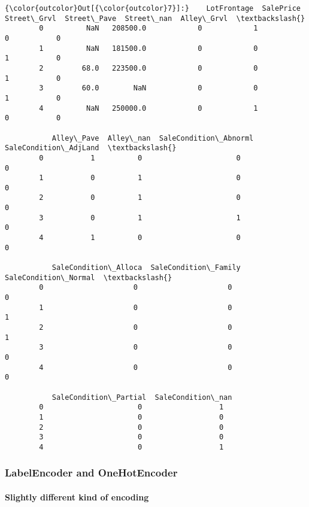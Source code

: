 \documentclass[11pt]{article}
\begin{document}
\begin{Verbatim}[commandchars=\\\{\}]
{\color{outcolor}Out[{\color{outcolor}7}]:}    LotFrontage  SalePrice  Street\_Grvl  Street\_Pave  Street\_nan  Alley\_Grvl  \textbackslash{}
        0          NaN   208500.0            0            1           0           0   
        1          NaN   181500.0            0            0           1           0   
        2         68.0   223500.0            0            0           1           0   
        3         60.0        NaN            0            0           1           0   
        4          NaN   250000.0            0            1           0           0   
        
           Alley\_Pave  Alley\_nan  SaleCondition\_Abnorml  SaleCondition\_AdjLand  \textbackslash{}
        0           1          0                      0                      0   
        1           0          1                      0                      0   
        2           0          1                      0                      0   
        3           0          1                      1                      0   
        4           1          0                      0                      0   
        
           SaleCondition\_Alloca  SaleCondition\_Family  SaleCondition\_Normal  \textbackslash{}
        0                     0                     0                     0   
        1                     0                     0                     1   
        2                     0                     0                     1   
        3                     0                     0                     0   
        4                     0                     0                     0   
        
           SaleCondition\_Partial  SaleCondition\_nan  
        0                      0                  1  
        1                      0                  0  
        2                      0                  0  
        3                      0                  0  
        4                      0                  1  
\end{Verbatim}
            
    \subsubsection{LabelEncoder and
OneHotEncoder}\label{labelencoder-and-onehotencoder}

\paragraph{Slightly different kind of
encoding}\label{slightly-different-kind-of-encoding}
\end{document}
